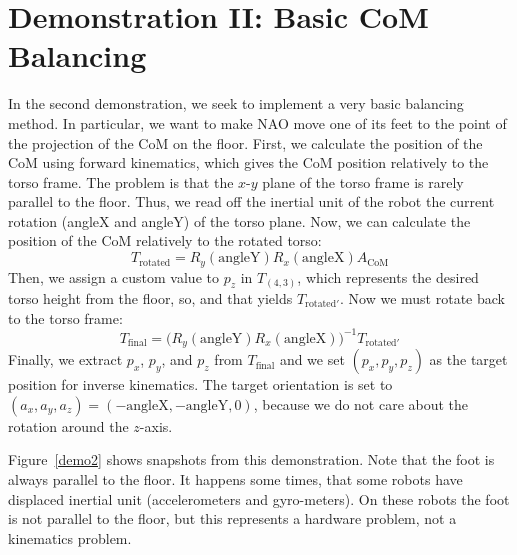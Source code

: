 \section{Demonstration II: Basic CoM Balancing}

In the second demonstration, we seek to implement a very basic balancing method. In particular, we want to make NAO move one of its feet to the point of the projection of the CoM on the floor. First, we calculate the position of the CoM using forward kinematics, which gives the CoM position relatively to the torso frame. The problem is that the $x$-$y$ plane of the torso frame is rarely parallel to the floor. Thus, we read off the inertial unit of the robot the current rotation (angleX and angleY) of the torso plane. Now, we can calculate the position of the CoM relatively to the rotated torso:
\[
	T_{\text{rotated}} = R_y(\text{angleY})R_x(\text{angleX})A_{\text{CoM}}
\]
Then, we assign a custom value to $p_z$ in $T_{(4,3)}$, which represents the desired torso height from the floor, so, and that yields $T_{\text{rotated}'}$. Now we must rotate back to the torso frame:
\[
	T_{\text{final}} = \big(R_y(\text{angleY})R_x(\text{angleX})\big)^{-1}T_{\text{rotated}'}
\]
Finally, we extract $p_x$, $p_y$, and $p_z$ from $T_{\text{final}}$ and we set $(p_x,p_y,p_z)$ as the target position for inverse kinematics. The target orientation is set to $(a_x,a_y,a_z) = (-\text{angleX}, -\text{angleY}, 0)$, because we do not care about the rotation around the $z$-axis. 

Figure~\ref{demo2} shows snapshots from this demonstration. Note that the foot is always parallel to the floor. It happens some times, that some robots have displaced inertial unit (accelerometers and gyro-meters). On these robots the foot is not parallel to the floor, but this represents a hardware problem, not a kinematics problem.

